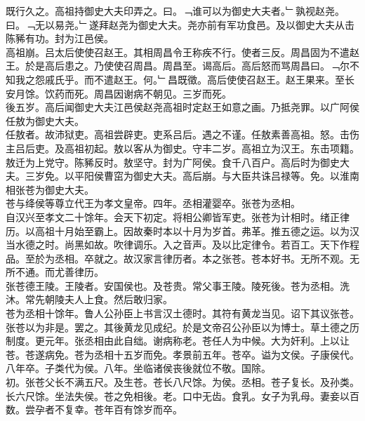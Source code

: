 \documentclass{zhvt-classic}
\begin{document}
\hspace*{2em}既行久之。高祖持御史大夫印弄之。曰。﹁谁可以为御史大夫者。﹂孰视赵尧。曰。﹁无以易尧。﹂遂拜赵尧为御史大夫。尧亦前有军功食邑。及以御史大夫从击陈豨有功。封为江邑侯。\\
\hspace*{2em}高祖崩。吕太后使使召赵王。其相周昌令王称疾不行。使者三反。周昌固为不遣赵王。於是高后患之。乃使使召周昌。周昌至。谒高后。高后怒而骂周昌曰。﹁尔不知我之怨戚氏乎。而不遣赵王。何。﹂昌既徵。高后使使召赵王。赵王果来。至长安月馀。饮药而死。周昌因谢病不朝见。三岁而死。\\
\hspace*{2em}後五岁。高后闻御史大夫江邑侯赵尧高祖时定赵王如意之画。乃抵尧罪。以广阿侯任敖为御史大夫。\\
\hspace*{2em}任敖者。故沛狱吏。高祖尝辟吏。吏系吕后。遇之不谨。任敖素善高祖。怒。击伤主吕后吏。及高祖初起。敖以客从为御史。守丰二岁。高祖立为汉王。东击项籍。敖迁为上党守。陈豨反时。敖坚守。封为广阿侯。食千八百户。高后时为御史大夫。三岁免。以平阳侯曹窋为御史大夫。高后崩。与大臣共诛吕禄等。免。以淮南相张苍为御史大夫。\\
\hspace*{2em}苍与绛侯等尊立代王为孝文皇帝。四年。丞相灌婴卒。张苍为丞相。\\
\hspace*{2em}自汉兴至孝文二十馀年。会天下初定。将相公卿皆军吏。张苍为计相时。绪正律历。以高祖十月始至霸上。因故秦时本以十月为岁首。弗革。推五德之运。以为汉当水德之时。尚黑如故。吹律调乐。入之音声。及以比定律令。若百工。天下作程品。至於为丞相。卒就之。故汉家言律历者。本之张苍。苍本好书。无所不观。无所不通。而尤善律历。\\
\hspace*{2em}张苍德王陵。王陵者。安国侯也。及苍贵。常父事王陵。陵死後。苍为丞相。洗沐。常先朝陵夫人上食。然后敢归家。\\
\hspace*{2em}苍为丞相十馀年。鲁人公孙臣上书言汉土德时。其符有黄龙当见。诏下其议张苍。张苍以为非是。罢之。其後黄龙见成纪。於是文帝召公孙臣以为博士。草土德之历制度。更元年。张丞相由此自绌。谢病称老。苍任人为中候。大为奸利。上以让苍。苍遂病免。苍为丞相十五岁而免。孝景前五年。苍卒。谥为文侯。子康侯代。八年卒。子类代为侯。八年。坐临诸侯丧後就位不敬。国除。\\
\hspace*{2em}初。张苍父长不满五尺。及生苍。苍长八尺馀。为侯。丞相。苍子复长。及孙类。长六尺馀。坐法失侯。苍之免相後。老。口中无齿。食乳。女子为乳母。妻妾以百数。尝孕者不复幸。苍年百有馀岁而卒。\\
\end{document}

